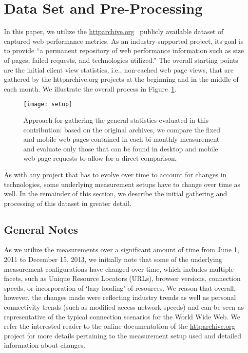 \section*{Data Set and Pre-Processing}
\label{s:dataset}
In this paper, we utilize the \url{httparchive.org}~\cite{ht13} publicly available dataset of captured web performance metrics. 
As an industry-supported project, its goal is to provide ``a permanent repository of web performance information such as size of pages, failed requests, and technologies utilized.''
The overall starting points are the initial client view statistics, i.e., non-cached web page views, that are gathered by the httparchive.org projects at the beginning and in the middle of each month.
We illustrate the overall process in Figure~\ref{fig:setup}.
\begin{figure}
	\centering
	\texttt{[image: setup]}
	\caption{Approach for gathering the general statistics evaluated in this contribution: based on the original archives, we compare the fixed and mobile web pages contained in each bi-monthly measurement and evaluate only those that can be found in desktop and mobile web page requests to allow for a direct comparison.}
	\label{fig:setup}
\end{figure}
As with any project that has to evolve over time to account for changes in technologies, some underlying measurement setups have to change over time as well.
In the remainder of this section, we describe the initial gathering and processing of this dataset in greater detail.


\subsection*{General Notes}
As we utilize the measurements over a significant amount of time from June 1, 2011 to December 15, 2013, we initially note that some of the underlying measurement configurations have changed over time, which includes multiple facets, such as Unique Resource Locators (URLs), browser versions, connection speeds, or incorporation of `lazy loading' of resources.
We reason that overall, however, the changes made were reflecting industry trends as well as personal connectivity trends (such as modified access network speeds) and can be seen as representative of the typical connection scenarios for the World Wide Web.
We refer the interested reader to the online documentation of the \url{httparchive.org} project for more details pertaining to the measurement setup used and detailed information about changes.

